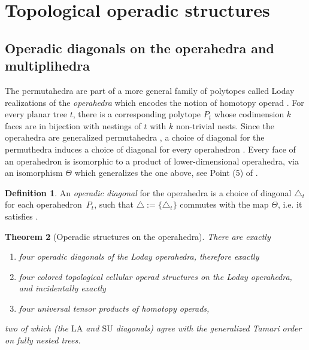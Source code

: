 \documentclass{amsart}
\newtheorem{theorem}{Theorem}[section]
\theoremstyle{definition}
\newtheorem{definition}[theorem]{Definition}
\newcommand{\SU}{\mathrm{SU}}
\newcommand{\LA}{\mathrm{LA}}
\begin{document}

\section{Topological operadic structures}


\subsection{Operadic diagonals on the operahedra and multiplihedra}

The permutahedra are part of a more general family of polytopes called Loday realizations of the \emph{operahedra} \cite[Def. 2.9]{LA21} which encodes the notion of homotopy operad \cite[Def. 4.11]{LA21}.
For every planar tree $t$, there is a corresponding polytope $P_t$ whose codimension $k$ faces are in bijection with nestings of $t$ with $k$ non-trivial nests.
Since the operahedra are generalized permutahedra \cite[Cor. 2.16]{LA21}, a choice of diagonal for the permuthedra induces a choice of diagonal for every operahedron \cite[Cor. 1.31]{LA21}.
Every face of an operahedron is isomorphic to a product of lower-dimensional operahedra, via an isomorphism $\Theta$ which generalizes the one above, see Point (5) of \cite[Prop. 2.3]{LA21}.

\begin{definition}
    An \emph{operadic diagonal} for the operahedra is a choice of diagonal $\triangle_t$ for each operahedron~$P_t$, such that $\triangle:=\{\triangle_t\}$ commutes with the map $\Theta$, i.e. it satisfies \cite[Prop. 4.14]{LA21}.
\end{definition}

\begin{theorem}[Operadic structures on the operahedra] 
    \label{thm:operahedra}
There are exactly 
\begin{enumerate}
    \item four operadic diagonals of the Loday operahedra, therefore exactly
    \item four colored topological cellular operad structures on the Loday operahedra, and incidentally exactly
    \item four universal tensor products of homotopy operads,
\end{enumerate}
two of which (the $\LA$ and $\SU$ diagonals) agree with the generalized Tamari order on fully nested trees. 
\end{theorem}
\end{document}
